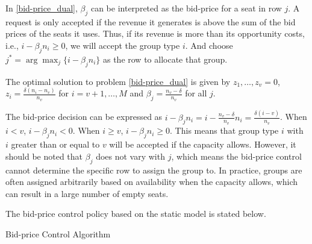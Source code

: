 In \eqref{bid-price_dual}, $\beta_{j}$ can be interpreted as the bid-price for a seat in row $j$. A request is only accepted if the revenue it generates is above the sum of the bid prices of the seats it uses. Thus, if its revenue is more than its opportunity costs, i.e., $i -\beta_{j} n_i \geq 0$, we will accept the group type $i$. And choose $j^{*} = \arg \max_{j} \{i -\beta_{j} n_i\}$ as the row to allocate that group.


\begin{lem}\label{bid-price}
 The optimal solution to problem \eqref{bid-price_dual} is given by $z_1 ,\ldots, z_v =0$, $z_{i} = \frac{\delta(n_i-n_v)}{n_v}$ for $i = v+1, \ldots, M$ and $\beta_j = \frac{n_v - \delta}{n_v}$ for all $j$.
\end{lem}

The bid-price decision can be expressed as $i - \beta_j n_i = i - \frac{n_v - \delta}{n_v} n_i = \frac{\delta (i - v)}{n_v}$. When $i < v$, $i - \beta_j n_i < 0$. When $i \geq v$, $i - \beta_j n_i \geq 0$. This means that group type $i$ with $i$ greater than or equal to $v$ will be accepted if the capacity allows. However, it should be noted that $\beta_j$ does not vary with $j$, which means the bid-price control cannot determine the specific row to assign the group to. In practice, groups are often assigned arbitrarily based on availability when the capacity allows, which can result in a large number of empty seats.

The bid-price control policy based on the static model is stated below.

\begin{algorithm}[H]
  \caption{Bid-price Control Algorithm}\label{algo_bid}
\end{algorithm}


